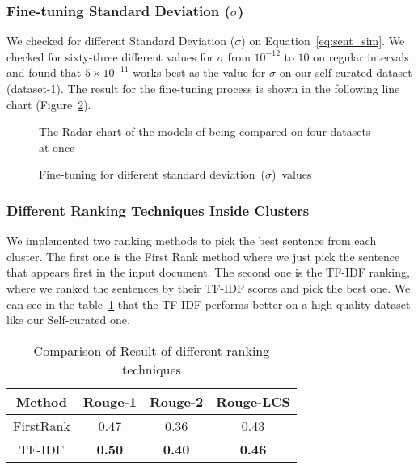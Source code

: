\subsubsection{Fine-tuning Standard Deviation ($\sigma$)}\label{subsubsec:sigma}
We checked for different Standard Deviation ($\sigma$) on Equation~\ref{eq:sent_sim}.
We checked for sixty-three different values for $\sigma$ from $10^{-12}$ to $10$ on regular intervals
and found that $5\times10^{-11}$ works best as the value for $\sigma$ on our self-curated dataset (dataset-1).
The result for the fine-tuning process is shown in the following line chart (Figure~\ref{fig:sigma-fine-tuning}).

\begin{figure}[]
    \centering
    
    \caption{The Radar chart of the models of being compared on four datasets at once}
    \label{fig:radarchart}
\end{figure}
\begin{figure}
    \centering
    
    \caption{Fine-tuning for different standard deviation~($\sigma$)~values}
    \label{fig:sigma-fine-tuning}
\end{figure}

\subsubsection{Different Ranking Techniques Inside Clusters}\label{subsubsec:different-ranking-techniques-inside-clusters}
We implemented two ranking methods to pick the best sentence from each cluster.
The first one is the First Rank method where we just pick the sentence that appears first in the input document.
The second one is the TF-IDF ranking, where we ranked the sentences by their TF-IDF scores and pick the best one.
We can see in the table~\ref{tab:ranking} that the TF-IDF performs
better on a high quality dataset like our Self-curated one.

\begin{table}[]
    \centering
    \begin{tabular}{cccc}\hline
        Method      & Rouge-1       & Rouge-2       & Rouge-LCS     \\\hline
        FirstRank   & 0.47          & 0.36          & 0.43          \\
        TF-IDF      & \textbf{0.50} & \textbf{0.40} & \textbf{0.46} \\\hline
    \end{tabular}
    \caption{Comparison of Result of different ranking techniques}
    \label{tab:ranking}
\end{table}

